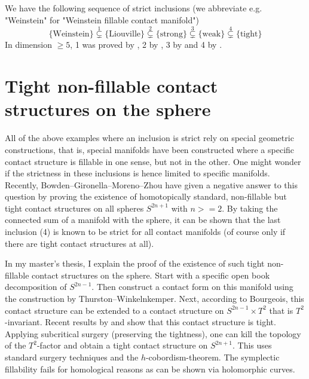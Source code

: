 \documentclass[a4paper]{amsart}
\begin{document}
We have the following sequence of strict inclusions (we abbreviate e.g. "Weinstein" for "Weinstein fillable contact manifold")
\[
      \{\text{Weinstein}\} \overset{1}{\subsetneq} \{\text{Liouville}\} \overset{2}{\subsetneq} \{\text{strong}\} \overset{3}{\subsetneq} \{\text{weak}\} \overset{4}{\subsetneq} \{\text{tight}\}
\]
In dimension $\ge 5$, 1 was proved by \cite[Theorem 1.5]{BCS14}, 2 by \cite{Zhou21}, 3 by \cite{BGM22} and 4 by \cite{MNW13}.



\section*{Tight non-fillable contact structures on the sphere}

All of the above examples where an inclusion is strict rely on special geometric
constructions, that is, special manifolds have been constructed where a specific
contact structure is fillable in one sense, but not in the other.
One might wonder if the strictness in these inclusions is hence limited
to specific manifolds. 
Recently, Bowden--Gironella--Moreno--Zhou \cite{BGMZ22} have given a negative answer to this question by proving the existence of homotopically standard, non-fillable but tight contact structures on all spheres $S^{2n+1}$ with $n >= 2$.
By taking the connected sum of a manifold with the sphere, it can be shown that the last inclusion (4) is known to be strict for all contact manifolds (of course only if there are tight contact structures at all).

In my master's thesis, I explain the proof of the existence of such tight non-fillable contact structures on the sphere.
Start with a specific open book decomposition of $S^{2n-1}$.
Then construct a contact form on this manifold using the construction by Thurston--Winkelnkemper. 
Next, according to Bourgeois, this contact structure can be extended to a contact structure on $S^{2n-1}\times T^2$ that is $T^2$-invariant.
Recent results by \cite{BGM22} and \cite{AZ24} show that this contact structure is tight.
Applying subcritical surgery (preserving the tightness), one can kill the topology of the $T^2$-factor and obtain a tight contact structure on $S^{2n+1}$.
This uses standard surgery techniques and the $h$-cobordism-theorem.
The symplectic fillability fails for homological reasons as can be shown via holomorphic curves. 
\end{document}
